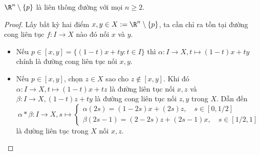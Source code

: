\begin{lemma}
    $\R^n\setminus\{p\}$ là liên thông đường với mọi $n\geq 2$.
\end{lemma}
\begin{proof}
    Lấy bất kỳ hai điểm $x,y\in X:=\R^n\setminus\{p\}$, ta cần chỉ ra tồn tại đường cong liên tục $f:I\to X$ nào đó nối $x$ và $y$.
    \begin{itemize}
        \item Nếu $p\in [x,y]=\{(1-t)x+ty:t\in I\}$ thì $\alpha:I\to X, t\mapsto (1-t)x+ty$ chính là đường cong liên tục nối $x,y$.

        \item Nếu $p\in [x,y]$, chọn $z\in X$ sao cho $z\notin [x,y]$. Khi đó $\alpha:I\to X, t\mapsto (1-t)x+tz$ là đường liên tục nối $x,z$ và $\beta:I\to X, (1-t)z+ty$ là đường cong liên tục nối $z,y$ trong $X$. Dẫn đến 
        \[\alpha*\beta:I\to X, s\mapsto\begin{cases}
            \alpha(2s) =  (1-2s)x+(2s)z,\quad s\in [0,1/2]\\
            \beta(2s-1) =  (2-2s)z+(2s-1)x,\quad s\in [1/2,1]
        \end{cases}\]
        là đường liên tục trong $X$ nối $x,z$.
    \end{itemize}
\end{proof}

